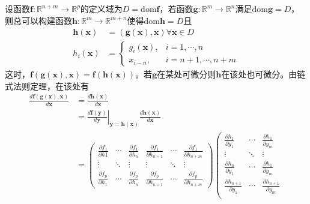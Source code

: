 \documentclass[main.tex]{subfiles}
\begin{document}
\begin{example}\label{exp:II.15.1}
设函数$\mathbf{f}:\mathbb{R}^{n+m}\rightarrow\mathbb{R}^p$的定义域为$D=\mathrm{dom}\mathbf{f}$，若函数$\mathbf{g}:\mathbb{R}^m\rightarrow\mathbb{R}^n$满足$\mathrm{dom}\mathbf{g}=D$，则总可以构建函数$\mathbf{h}:\mathbb{R}^m\rightarrow\mathbb{R}^{m+n}$使得$\mathrm{dom}\mathbf{h}=D$且
\begin{align*}
    \mathbf{h}\left(\mathbf{x}\right)&=\left(\mathbf{g}\left(\mathbf{x}\right),\mathbf{x}\right)\forall\mathbf{x}\in D\\
    h_i\left(\mathbf{x}\right)&=\left\{\begin{array}{ll}
    g_i\left(\mathbf{x}\right),&i=1,\cdots,n\\
    x_{i-n},&i=n+1,\cdots,n+m
    \end{array}\right.
\end{align*}
这时，$\mathbf{f}\left(\mathbf{g}\left(\mathbf{x}\right),\mathbf{x}\right)=\mathbf{f}\left(\mathbf{h}\left(\mathbf{x}\right)\right)$。若$\mathbf{g}$在某处可微分则$\mathbf{h}$在该处也可微分。由链式法则定理，在该处有
\begin{align*}
    \frac{d\mathbf{f}\left(\mathbf{g}\left(\mathbf{x}\right),\mathbf{x}\right)}{d\mathbf{x}}&=\frac{d\mathbf{h}\left(\mathbf{x}\right)}{d\mathbf{x}}\\
    &=\left.\frac{d\mathbf{f}\left(\mathbf{y}\right)}{d\mathbf{y}}\right|_{\mathbf{y}=\mathbf{h}\left(\mathbf{x}\right)}\frac{d\mathbf{h}\left(\mathbf{x}\right)}{d\mathbf{x}}\\
    &=\left(\begin{array}{cccccc}
    \frac{\partial f_1}{\partial h1}&\cdots&\frac{\partial f_1}{\partial h_n}&\frac{\partial f_1}{\partial h_{n+1}}&\cdots&\frac{\partial f_1}{\partial h_{n+m}}\\
    \vdots&\ddots&\vdots&\vdots&\ddots&\vdots\\
    \frac{\partial f_p}{\partial h_1}&\cdots&\frac{\partial f_p}{\partial h_n}&\frac{\partial f_p}{\partial h_{n+1}}&\cdots&\frac{\partial f_p}{\partial h_{n+m}}
    \end{array}\right)\left(\begin{array}{ccc}
    \frac{\partial h_1}{\partial y_1}&\cdots&\frac{\partial h_1}{\partial y_m}\\
    \vdots&\ddots&\vdots\\
    \frac{\partial h_n}{\partial y_1}&\cdots&\frac{\partial h_1}{\partial y_m}\\
    \frac{\partial h_{n+1}}{\partial y_1}&\cdots&\frac{\partial h_{n+1}}{\partial y_m}\\

\end{array}
\end{align*}
\end{example}
\end{document}
